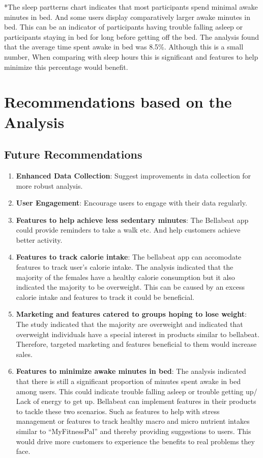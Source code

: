 \documentclass[
]{article}
\providecommand{\tightlist}{%
  \setlength{\itemsep}{0pt}\setlength{\parskip}{0pt}}
\begin{document}
*The sleep partterns chart indicates that most participants spend
minimal awake minutes in bed. And some users display comparatively
larger awake minutes in bed. This can be an indicator of participants
having trouble falling asleep or participants staying in bed for long
before getting off the bed. The analysis found that the average time
spent awake in bed was 8.5\%. Although this is a small number, When
comparing with sleep hours this is significant and features to help
minimize this percentage would benefit.

\hypertarget{recommendations-based-on-the-analysis}{%
\section{Recommendations based on the
Analysis}\label{recommendations-based-on-the-analysis}}

\hypertarget{future-recommendations}{%
\subsection{Future Recommendations}\label{future-recommendations}}

\begin{enumerate}
\def\labelenumi{\arabic{enumi}.}
\tightlist
\item
  \textbf{Enhanced Data Collection}: Suggest improvements in data
  collection for more robust analysis.
\item
  \textbf{User Engagement}: Encourage users to engage with their data
  regularly.
\item
  \textbf{Features to help achieve less sedentary minutes}: The
  Bellabeat app could provide reminders to take a walk etc. And help
  customers achieve better activity.
\item
  \textbf{Features to track calorie intake}: The bellabeat app can
  accomodate features to track user's calorie intake. The analysis
  indicated that the majority of the females have a healthy calorie
  consumption but it also indicated the majority to be overweight. This
  can be caused by an excess calorie intake and features to track it
  could be beneficial.
\item
  \textbf{Marketing and features catered to groups hoping to lose
  weight}: The study indicated that the majority are overweight and
  indicated that overweight individuals have a special interest in
  products similar to bellabeat. Therefore, targeted marketing and
  features beneficial to them would increase sales.
\item
  \textbf{Features to minimize awake minutes in bed}: The analysis
  indicated that there is still a significant proportion of minutes
  spent awake in bed among users. This could indicate trouble falling
  asleep or trouble getting up/ Lack of energy to get up. Bellabeat can
  implement features in their products to tackle these two scenarios.
  Such as features to help with stress management or features to track
  healthy macro and micro nutrient intakes similar to ``MyFitnessPal''
  and thereby providing suggestions to users. This would drive more
  customers to experience the benefits to real problems they face.
\end{enumerate}
\end{document}
